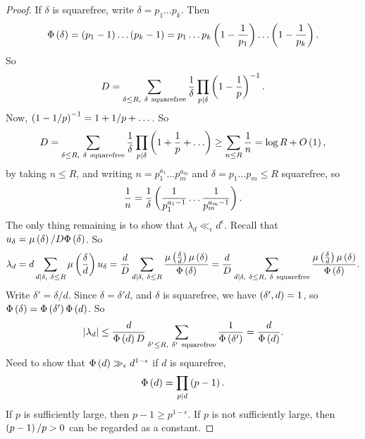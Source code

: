 \begin{proof}
If $ \delta $ is squarefree, write $ \delta = p_1 \dots p_k $. Then
$$ \Phi\left( \delta \right) = \left( p_1 - 1 \right) \dots \left( p_k - 1 \right) = p_1 \dots p_k\left( 1 - \dfrac{1}{p_1} \right) \dots \left( 1 - \dfrac{1}{p_k} \right). $$
So
$$ D = \sum_{\delta \le R, \ \delta \ \text{squarefree}} \dfrac{1}{\delta}\prod_{p \mid \delta} \left( 1 - \dfrac{1}{p} \right)^{-1}. $$
Now, $ \left( 1 - 1 / p \right)^{-1} = 1 + 1 / p + \dots $. So
$$ D = \sum_{\delta \le R, \ \delta \ \text{squarefree}} \dfrac{1}{\delta}\prod_{p \mid \delta} \rb{1 + \dfrac{1}{p} + \dots} \ge \sum_{n \le R} \dfrac{1}{n} = \log R + O\rb{1}, $$
by taking $ n \le R $, and writing $ n = p_1^{a_1} \dots p_m^{a_m} $ and $ \delta = p_1 \dots p_m \le R $ squarefree, so
$$ \dfrac{1}{n} = \dfrac{1}{\delta}\left( \dfrac{1}{p_1^{a_1 - 1}} \dots \dfrac{1}{p_m^{a_m - 1}} \right). $$
The only thing remaining is to show that $ \lambda_d \ll_\epsilon d^\epsilon $. Recall that $ u_\delta = \mu\left( \delta \right) / D\Phi\left( \delta \right) $. So
$$ \lambda_d = d\sum_{d \mid \delta, \ \delta \le R} \mu\rb{\dfrac{\delta}{d}}u_\delta = \dfrac{d}{D}\sum_{d \mid \delta, \ \delta \le R} \dfrac{\mu\rb{\tfrac{\delta}{d}}\mu\rb{\delta}}{\Phi\rb{\delta}} = \dfrac{d}{D}\sum_{d \mid \delta, \ \delta \le R, \ \delta \ \text{squarefree}} \dfrac{\mu\rb{\tfrac{\delta}{d}}\mu\rb{\delta}}{\Phi\rb{\delta}}. $$
Write $ \delta' = \delta / d $. Since $ \delta = \delta'd $, and $ \delta $ is squarefree, we have $ \left( \delta', d \right) = 1 $, so $ \Phi\left( \delta \right) = \Phi\left( \delta' \right)\Phi\left( d \right) $. So
$$ \abs{\lambda_d} \le \dfrac{d}{\Phi\rb{d}D}\sum_{\delta' \le R, \ \delta' \ \text{squarefree}} \dfrac{1}{\Phi\rb{\delta'}} = \dfrac{d}{\Phi\rb{d}}. $$
Need to show that $ \Phi\left( d \right) \gg_\epsilon d^{1 - \epsilon} $ if $ d $ is squarefree,
$$ \Phi\left( d \right) = \prod_{p \mid d} \left( p - 1 \right). $$
If $ p $ is sufficiently large, then $ p - 1 \ge p^{1 - \epsilon} $. If $ p $ is not sufficiently large, then $ \left( p - 1 \right) / p > 0 $ can be regarded as a constant.
\end{proof}

